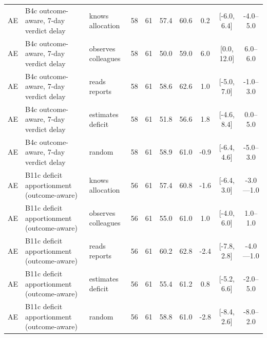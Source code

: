 \begin{table}[!t]
\begin{tabular}{lllccccccc}
AE & B4c outcome-aware, 7-day verdict delay & knows allocation & 58 & 61 & 57.4 & 60.6 & 0.2 & [-6.0, 6.4] & -4.0--5.0 \\
AE & B4c outcome-aware, 7-day verdict delay & observes colleagues & 58 & 61 & 50.0 & 59.0 & 6.0 & [0.0, 12.0] & 6.0--6.0 \\
AE & B4c outcome-aware, 7-day verdict delay & reads reports & 58 & 61 & 58.6 & 62.6 & 1.0 & [-5.0, 7.0] & -1.0--3.0 \\
AE & B4c outcome-aware, 7-day verdict delay & estimates deficit & 58 & 61 & 51.8 & 56.6 & 1.8 & [-4.6, 8.4] & 0.0--5.0 \\
AE & B4c outcome-aware, 7-day verdict delay & random & 58 & 61 & 58.9 & 61.0 & -0.9 & [-6.4, 4.6] & -5.0--3.0 \\
AE & B11c deficit apportionment (outcome-aware) & knows allocation & 56 & 61 & 57.4 & 60.8 & -1.6 & [-6.4, 3.0] & -3.0---1.0 \\
AE & B11c deficit apportionment (outcome-aware) & observes colleagues & 56 & 61 & 55.0 & 61.0 & 1.0 & [-4.0, 6.0] & 1.0--1.0 \\
AE & B11c deficit apportionment (outcome-aware) & reads reports & 56 & 61 & 60.2 & 62.8 & -2.4 & [-7.8, 2.8] & -4.0---1.0 \\
AE & B11c deficit apportionment (outcome-aware) & estimates deficit & 56 & 61 & 55.4 & 61.2 & 0.8 & [-5.2, 6.6] & -2.0--5.0 \\
AE & B11c deficit apportionment (outcome-aware) & random & 56 & 61 & 58.8 & 61.0 & -2.8 & [-8.4, 2.6] & -8.0--2.0 \\
\bottomrule
\end{tabular}
\end{table}

